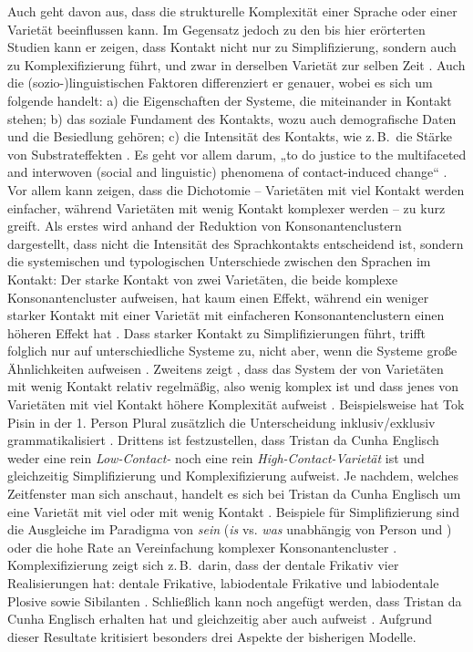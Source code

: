 Auch \citet{Schreier2016} geht davon aus, dass  die strukturelle Komplexität einer Sprache oder einer Varietät beeinflussen kann. Im Gegensatz jedoch zu den bis hier erörterten Studien kann er zeigen, dass Kontakt nicht nur zu Simplifizierung, sondern auch zu Komplexifizierung führt, und zwar in derselben Varietät zur selben Zeit \citep[139, 148-151]{Schreier2016}. Auch die (so\-zio-)lin\-gu\-is\-ti\-schen Faktoren differenziert er genauer, wobei es sich um folgende handelt: a) die Eigenschaften der Systeme, die miteinander in Kontakt stehen; b) das soziale Fundament des Kontakts, wozu auch demografische Daten und die Besiedlung gehören; c) die Intensität des Kontakts, wie z.\,B.\ die Stärke von Substrateffekten \citep[139]{Schreier2016}. Es geht vor allem darum, „to do justice to the multifaceted and interwoven (social and linguistic) phenomena of contact-induced change“ \citep[139]{Schreier2016}. Vor allem kann \citet{Schreier2016} zeigen, dass die Dichotomie – Varietäten mit viel Kontakt werden einfacher, während Varietäten mit wenig Kontakt komplexer werden – zu kurz greift. Als erstes wird anhand der Reduktion von Konsonantenclustern dargestellt, dass nicht die Intensität des Sprachkontakts entscheidend ist, sondern die systemischen und typologischen Unterschiede zwischen den Sprachen im Kontakt: Der starke Kontakt von zwei Varietäten, die beide komplexe Konsonantencluster aufweisen, hat kaum einen Effekt, während ein weniger starker Kontakt mit einer Varietät mit einfacheren Konsonantenclustern einen höheren Effekt hat \citep[144]{Schreier2016}. Dass starker Kontakt zu Simplifizierungen führt, trifft folglich nur auf unterschiedliche Systeme zu, nicht aber, wenn die Systeme große Ähnlichkeiten aufweisen \citep[144--145]{Schreier2016}. Zweitens zeigt \citet{Schreier2016}, dass das System der  von Varietäten mit wenig Kontakt relativ regelmäßig, also wenig komplex ist und dass jenes von Varietäten mit viel Kontakt höhere Komplexität aufweist \citep[145--147]{Schreier2016}. Beispielsweise hat Tok Pisin in der 1. Person Plural zusätzlich die Unterscheidung inklusiv/exklusiv grammatikalisiert \citep[147]{Schreier2016}. Drittens ist festzustellen, dass Tristan da Cunha Englisch weder eine rein \textit{Low-Contact-} noch eine rein \textit{High-Contact-Varietät} ist und gleichzeitig Simplifizierung und Komplexifizierung aufweist. Je nachdem, welches Zeitfenster man sich anschaut, handelt es sich bei Tristan da Cunha Englisch um eine Varietät mit viel oder mit wenig Kontakt \citep[148]{Schreier2016}. Beispiele für Simplifizierung sind die Ausgleiche im Paradigma von \textit{sein} (\textit{is} vs. \textit{was} unabhängig von Person und ) oder die hohe Rate an Vereinfachung komplexer Konsonantencluster \citep[149--150]{Schreier2016}. Komplexifizierung zeigt sich z.\,B.\ darin, dass der dentale Frikativ vier Realisierungen hat: dentale Frikative, labiodentale Frikative und labiodentale Plosive sowie Sibilanten \citep[150]{Schreier2016}. Schließlich kann noch angefügt werden, dass Tristan da Cunha Englisch  erhalten hat und gleichzeitig aber auch  aufweist \citep[150--151]{Schreier2016}. Aufgrund dieser Resultate kritisiert \citet{Schreier2016} besonders drei Aspekte der bisherigen Modelle. 
